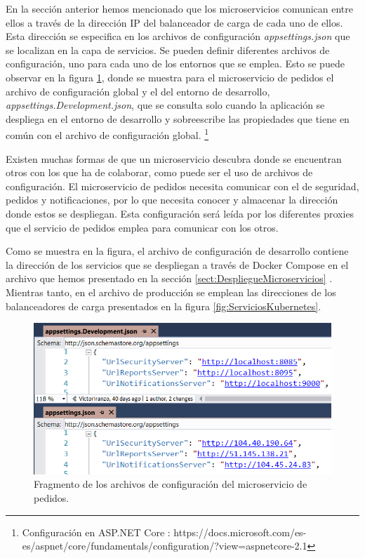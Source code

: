 \documentclass[11pt,spanish,listoffigures]{tfgetsinf}
\begin{document}
En la sección anterior hemos mencionado que los microservicios comunican entre ellos a través de la dirección IP del balanceador de carga de cada uno de ellos. Esta dirección se especifica en los archivos de configuración \textit{appsettings.json} que se localizan en la capa de servicios. Se pueden definir diferentes archivos de configuración, uno para cada uno de los entornos que se emplea. Esto se puede observar en la figura \ref{fig:appsettings}, donde se muestra para el microservicio de pedidos el archivo de configuración global y el del entorno de desarrollo, \textit{appsettings.Development.json}, que se consulta solo cuando la aplicación se despliega en el entorno de desarrollo y sobreescribe las propiedades que tiene en común con el archivo de configuración global. \footnote{ Configuración en ASP.NET Core
: https://docs.microsoft.com/es-es/aspnet/core/fundamentals/configuration/?view=aspnetcore-2.1} 

Existen muchas formas de que un microservicio descubra donde se encuentran otros con los que ha de colaborar, como puede ser el uso de archivos de configuración. El microservicio de pedidos necesita comunicar con el de seguridad, pedidos y notificaciones, por lo que necesita conocer y almacenar la dirección donde estos se despliegan. Esta configuración será leída por los diferentes proxies que el servicio de pedidos emplea para comunicar con los otros.

Como se muestra en la figura, el archivo de configuración de desarrollo contiene la dirección de los servicios que se despliegan a través de Docker Compose en el archivo que hemos presentado en la sección \ref{sect:DespliegueMicroservicios} . Mientras tanto, en el archivo de producción se emplean las direcciones de los balanceadores de carga presentados en la figura \ref{fig:ServiciosKubernetes}.

\begin{figure}[h]
\centering
\includegraphics[scale=0.7]{appsettings}
\caption{Fragmento de los archivos de configuración del microservicio de pedidos.}
\label{fig:appsettings}
\end{figure}
\end{document}
